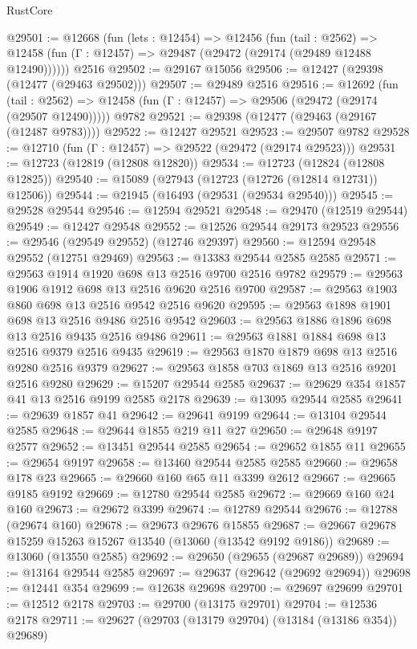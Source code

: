 \begin{lexlean}{RustCore}
\begin{coremodule}
@29501 := @12668
    (fun (lets : @12454) =>
    @12456
      (fun (tail : @2562) =>
      @12458 (fun (Γ : @12457) => @29487 (@29472 (@29174 (@29489 @12488 @12490))))))
    @2516
@29502 := @29167 @15056
@29506 := @12427 (@29398 (@12477 (@29463 @29502)))
@29507 := @29489 @2516
@29516 := @12692
    (fun (tail : @2562) => @12458 (fun (Γ : @12457) => @29506 (@29472 (@29174 (@29507 @12490)))))
    @9782
@29521 := @29398 (@12477 (@29463 (@29167 (@12487 @9783))))
@29522 := @12427 @29521
@29523 := @29507 @9782
@29528 := @12710 (fun (Γ : @12457) => @29522 (@29472 (@29174 @29523)))
@29531 := @12723 (@12819 (@12808 @12820))
@29534 := @12723 (@12824 (@12808 @12825))
@29540 := @15089 (@27943 (@12723 (@12726 (@12814 @12731)) @12506))
@29544 := @21945 (@16493 (@29531 (@29534 @29540)))
@29545 := @29528 @29544
@29546 := @12594 @29521
@29548 := @29470 (@12519 @29544)
@29549 := @12427 @29548
@29552 := @12526 @29544 @29173 @29523
@29556 := @29546 (@29549 @29552) (@12746 @29397)
@29560 := @12594 @29548 @29552 (@12751 @29469)
@29563 := @13383 @29544 @2585 @2585
@29571 := @29563 @1914 @1920 @698 @13 @2516 @9700 @2516 @9782
@29579 := @29563 @1906 @1912 @698 @13 @2516 @9620 @2516 @9700
@29587 := @29563 @1903 @860 @698 @13 @2516 @9542 @2516 @9620
@29595 := @29563 @1898 @1901 @698 @13 @2516 @9486 @2516 @9542
@29603 := @29563 @1886 @1896 @698 @13 @2516 @9435 @2516 @9486
@29611 := @29563 @1881 @1884 @698 @13 @2516 @9379 @2516 @9435
@29619 := @29563 @1870 @1879 @698 @13 @2516 @9280 @2516 @9379
@29627 := @29563 @1858 @703 @1869 @13 @2516 @9201 @2516 @9280
@29629 := @15207 @29544 @2585
@29637 := @29629 @354 @1857 @41 @13 @2516 @9199 @2585 @2178
@29639 := @13095 @29544 @2585
@29641 := @29639 @1857 @41
@29642 := @29641 @9199
@29644 := @13104 @29544 @2585
@29648 := @29644 @1855 @219 @11 @27
@29650 := @29648 @9197 @2577
@29652 := @13451 @29544 @2585
@29654 := @29652 @1855 @11
@29655 := @29654 @9197
@29658 := @13460 @29544 @2585 @2585
@29660 := @29658 @178 @23
@29665 := @29660 @160 @65 @11 @3399 @2612
@29667 := @29665 @9185 @9192
@29669 := @12780 @29544 @2585
@29672 := @29669 @160 @24 @160
@29673 := @29672 @3399
@29674 := @12789 @29544
@29676 := @12788 (@29674 @160)
@29678 := @29673 @29676 @15855
@29687 := @29667 @29678 @15259 @15263 @15267 @13540 (@13060 (@13542 @9192 @9186))
@29689 := @13060 (@13550 @2585)
@29692 := @29650 (@29655 (@29687 @29689))
@29694 := @13164 @29544 @2585
@29697 := @29637 (@29642 (@29692 @29694))
@29698 := @12441 @354
@29699 := @12638 @29698
@29700 := @29697 @29699
@29701 := @12512 @2178
@29703 := @29700 (@13175 @29701)
@29704 := @12536 @2178
@29711 := @29627 (@29703 (@13179 @29704) (@13184 (@13186 @354)) @29689)

\end{coremodule}
\end{lexlean}
